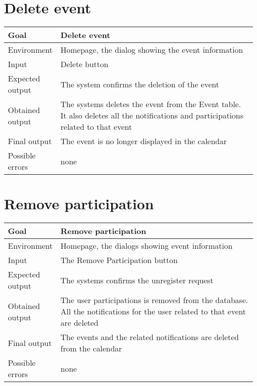 \documentclass[10pt,a4paper,titlepage]{article}
\begin{document}
\section{Delete event}
\begin{tabular}{| p{0.2\linewidth} | p{0.8\linewidth} |}
\hline Goal & Delete event \\
\hline Environment & Homepage, the dialog showing the event information \\
\hline Input & Delete button \\
\hline Expected output & The system confirms the deletion of the event \\
\hline Obtained output & The systems deletes the event from the Event table. It also
deletes all the notifications and participations related to that event \\
\hline Final output & The event is no longer displayed in the calendar \\
\hline Possible errors & none \\
\hline
\end{tabular}


\section{Remove participation}
\begin{tabular}{| p{0.2\linewidth} | p{0.8\linewidth} |}
\hline Goal & Remove participation \\
\hline Environment & Homepage, the dialogs showing event information \\
\hline Input & The Remove Participation button \\
\hline Expected output & The systems confirms the unregister request \\
\hline Obtained output & The user participations is removed from the database. All the
notifications for the user related to that event are deleted \\
\hline Final output & The events and the related notifications are deleted from the calendar \\
\hline Possible errors & none \\
\hline
\end{tabular}
\end{document}
